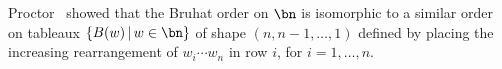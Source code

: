 Proctor~\cite[Thm.\,5BC]{ProctorBruhat} showed that the Bruhat order on $\bn$
is isomorphic to a similar order on tableaux $\{B(w) \,|\, w \in \bn \}$
of shape $(n,n-1,\dotsc,1)$ defined by placing the
increasing rearrangement of $w_i \cdots w_n$ in row $i$,
for $i = 1, \dotsc, n$.

